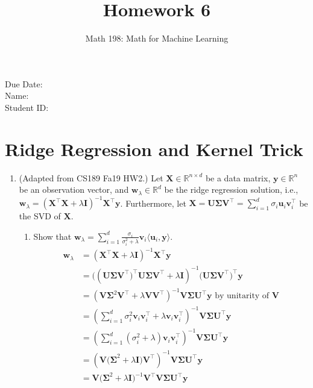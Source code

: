 \documentclass{article}
\title{Homework 6}
\author{Math 198: Math for Machine Learning}
\date{}
\begin{document}
\maketitle

\noindent
Due Date:  \\
Name: \\
Student ID:

\section{Ridge Regression and Kernel Trick}
\begin{enumerate}[label=\arabic*.]
\item (Adapted from CS189 Fa19 HW2.) Let $\mathbf{X} \in \mathbb{R}^{n \times d}$ be a data matrix, $\mathbf{y} \in \mathbb{R}^n$ be an observation vector, and $\mathbf{w}_\lambda \in \mathbb{R}^d$ be the ridge regression solution, i.e., $\mathbf{w}_\lambda = (\mathbf{X^{\top}X} + \lambda\mathbf{I})^{-1}\mathbf{X^{\top}y}$. Furthermore, let $\mathbf{X} = \mathbf{U\Sigma V^{\top}} = \sum\limits_{i = 1}^d \sigma_i\mathbf{u}_i\mathbf{v}_i^{\top}$ be the SVD of $\mathbf{X}$.
		\begin{enumerate}
		\item Show that $\mathbf{w}_\lambda = \sum\limits_{i=1}^d \frac{\sigma_i}{\sigma_i^2 + \lambda} \mathbf{v}_i\langle \mathbf{u}_i, \mathbf{y} \rangle$. \\
		{\color{blue} \begin{align*}
		\mathbf{w}_\lambda &= (\mathbf{X^{\top}X} + \lambda\mathbf{I})^{-1}\mathbf{X^{\top}y} \\
		&= ((\mathbf{U\Sigma V^{\top})^{\top}U\Sigma V^{\top} +} \lambda\mathbf{I})^{-1}(\mathbf{U\Sigma V^{\top})^{\top}y} \\
		&= (\mathbf{V\Sigma}^2\mathbf{V^{\top} +} \lambda\mathbf{VV^{\top}})^{-1}\mathbf{V\Sigma U^{\top}y} \text{ by unitarity of } \mathbf{V} \\
		&= (\sum\limits_{i = 1}^d \sigma_i^2 \mathbf{v}_i\mathbf{v}_i^{\top} + \lambda\mathbf{v}_i\mathbf{v}_i^{\top})^{-1}\mathbf{V\Sigma U^{\top}y}  \\
		&= (\sum\limits_{i = 1}^d (\sigma_i^2 + \lambda)\mathbf{v}_i\mathbf{v}_i^{\top})^{-1}\mathbf{V\Sigma U^{\top}y} \\
		&= (\mathbf{V(\Sigma}^2 + \lambda\mathbf{I)V^{\top}})^{-1}\mathbf{V\Sigma U^{\top}y} \\
		&= \mathbf{V(\Sigma}^2 + \lambda\mathbf{I})^{-1}\mathbf{V^{\top}V\Sigma U^{\top}y} \\

\end{align*}}
\end{enumerate}
\end{enumerate}
\end{document}
